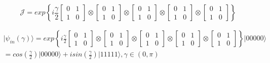 \begin{equation}
\mathcal{J}=exp\left\{ i\frac{\gamma}{2}\left[\begin{array}{cc}
0 & 1\\
1 & 0
\end{array}\right]\otimes\left[\begin{array}{cc}
0 & 1\\
1 & 0
\end{array}\right]\otimes\left[\begin{array}{cc}
0 & 1\\
1 & 0
\end{array}\right]\otimes\left[\begin{array}{cc}
0 & 1\\
1 & 0
\end{array}\right]
\otimes\left[\begin{array}{cc}
0 & 1\\
1 & 0
\end{array}\right]
\right\}
\label{eq:matrix_exponencial_esoterica}
\end{equation} 

\begin{center}
\begin{equation}
\begin{split}
\vert\psi_{in}(\gamma)\rangle=exp\left\{ i\frac{\gamma}{2}\left[\begin{array}{cc}
0 & 1\\
1 & 0
\end{array}\right]\otimes\left[\begin{array}{cc}
0 & 1\\
1 & 0
\end{array}\right]\otimes\left[\begin{array}{cc}
0 & 1\\
1 & 0
\end{array}\right]\otimes\left[\begin{array}{cc}
0 & 1\\
1 & 0
\end{array}\right]\otimes\left[\begin{array}{cc}
0 & 1\\
1 & 0
\end{array}\right]\right\} \vert00000\rangle \\
=cos(\frac{\gamma}{2})\vert00000\rangle+isin(\frac{\gamma}{2})\vert11111\rangle,\gamma\in(0,\pi)
\end{split}
\label{eq:estado_inicial_pg}
\end{equation}
\end{center}



